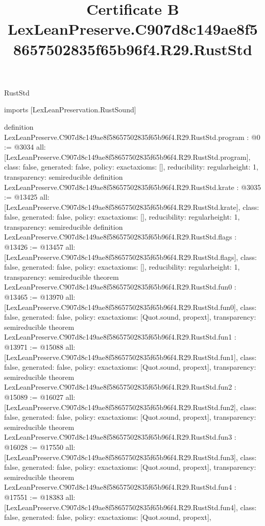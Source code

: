 \begin{lexlean}{RustStd}
\title{Certificate B LexLeanPreserve.C907d8c149ae8f58657502835f65b96f4.R29.RustStd}
\begin{coremodule}
imports [LexLeanPreservation.RustSound]

definition LexLeanPreserve.C907d8c149ae8f58657502835f65b96f4.R29.RustStd.program : @0 := @3034 {
  all: [LexLeanPreserve.C907d8c149ae8f58657502835f65b96f4.R29.RustStd.program],
  class: false,
  generated: false,
  policy: exact{axioms: []},
  reducibility: regular{height: 1},
  transparency: semireducible
}
definition LexLeanPreserve.C907d8c149ae8f58657502835f65b96f4.R29.RustStd.krate : @3035 := @13425 {
  all: [LexLeanPreserve.C907d8c149ae8f58657502835f65b96f4.R29.RustStd.krate],
  class: false,
  generated: false,
  policy: exact{axioms: []},
  reducibility: regular{height: 1},
  transparency: semireducible
}
definition LexLeanPreserve.C907d8c149ae8f58657502835f65b96f4.R29.RustStd.flags : @13426 := @13457 {
  all: [LexLeanPreserve.C907d8c149ae8f58657502835f65b96f4.R29.RustStd.flags],
  class: false,
  generated: false,
  policy: exact{axioms: []},
  reducibility: regular{height: 1},
  transparency: semireducible
}
theorem LexLeanPreserve.C907d8c149ae8f58657502835f65b96f4.R29.RustStd.fun0 : @13465 := @13970 {
  all: [LexLeanPreserve.C907d8c149ae8f58657502835f65b96f4.R29.RustStd.fun0],
  class: false,
  generated: false,
  policy: exact{axioms: [Quot.sound, propext]},
  transparency: semireducible
}
theorem LexLeanPreserve.C907d8c149ae8f58657502835f65b96f4.R29.RustStd.fun1 : @13971 := @15088 {
  all: [LexLeanPreserve.C907d8c149ae8f58657502835f65b96f4.R29.RustStd.fun1],
  class: false,
  generated: false,
  policy: exact{axioms: [Quot.sound, propext]},
  transparency: semireducible
}
theorem LexLeanPreserve.C907d8c149ae8f58657502835f65b96f4.R29.RustStd.fun2 : @15089 := @16027 {
  all: [LexLeanPreserve.C907d8c149ae8f58657502835f65b96f4.R29.RustStd.fun2],
  class: false,
  generated: false,
  policy: exact{axioms: [Quot.sound, propext]},
  transparency: semireducible
}
theorem LexLeanPreserve.C907d8c149ae8f58657502835f65b96f4.R29.RustStd.fun3 : @16028 := @17550 {
  all: [LexLeanPreserve.C907d8c149ae8f58657502835f65b96f4.R29.RustStd.fun3],
  class: false,
  generated: false,
  policy: exact{axioms: [Quot.sound, propext]},
  transparency: semireducible
}
theorem LexLeanPreserve.C907d8c149ae8f58657502835f65b96f4.R29.RustStd.fun4 : @17551 := @18383 {
  all: [LexLeanPreserve.C907d8c149ae8f58657502835f65b96f4.R29.RustStd.fun4],
  class: false,
  generated: false,
  policy: exact{axioms: [Quot.sound, propext]},
}
\end{coremodule}
\end{lexlean}

